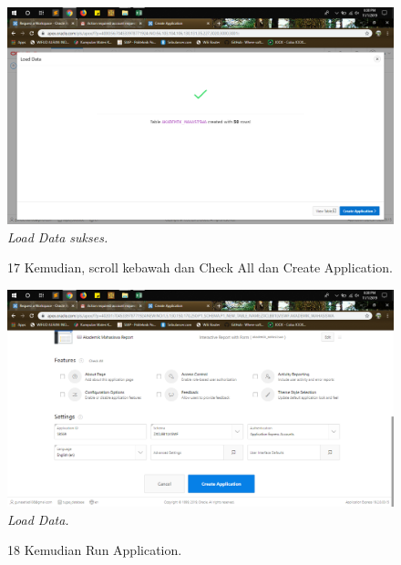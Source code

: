 \begin{enumerate}
\begin{figure}
    \begin{center}
\includegraphics[scale=0.2]{figures/g14.png}
    \caption{\textit{Load Data sukses.}}
        \end{center}
\label{gambar}
\end{figure}

\begin{figure}
\item[17] Kemudian, scroll kebawah dan Check All dan Create Application. 

    \begin{center}
\includegraphics[scale=0.2]{figures/g15.png}
    \caption{\textit{Load Data.}}
        \end{center}
\label{gambar}
\end{figure}

\begin{figure}
\item[18] Kemudian Run Application.


\end{figure}
\end{enumerate}
